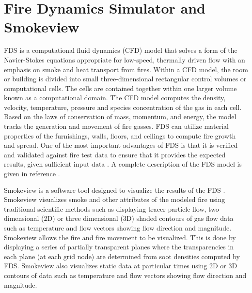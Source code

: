 \documentclass[11pt,oneside]{book}
\begin{document}
\chapter{Fire Dynamics Simulator and Smokeview}
FDS is a computational fluid dynamics (CFD) model that solves a form of the Navier-Stokes equations appropriate for low-speed, thermally driven flow with an emphasis on smoke and heat transport from fires.  Within a CFD model, the room or building is divided into small three-dimensional rectangular control volumes or computational cells.  The cells are contained together within one larger volume known as a computational domain.  The CFD model computes the density, velocity, temperature, pressure and species concentration of the gas in each cell.  Based on the laws of conservation of mass, momentum,  and energy, the model tracks the generation and movement of fire gasses.  FDS can utilize material properties of the furnishings, walls, floors, and ceilings to compute fire growth and spread.  One of the most important advantages of FDS is that it is verified and validated against fire test data to ensure that it provides the expected results, given sufficient input data \cite{FDS_Verification_Guide,FDS_Validation_Guide}.  A complete description of the FDS model is given in reference \cite{FDS_Tech_Guide}.

Smokeview is a software tool designed to visualize the results of the FDS \cite{Smokeview_Users_Guide}.  Smokeview visualizes smoke and other attributes of the modeled fire using traditional scientific methods such as displaying tracer particle flow, two dimensional (2D) or three dimensional (3D) shaded contours of gas flow data such as temperature and flow vectors showing flow direction and magnitude.  Smokeview allows the fire and fire movement to be visualized.  This is done by displaying a series of partially transparent planes where the transparencies in each plane (at each grid node) are determined from soot densities computed by FDS.  Smokeview also visualizes static data at particular times using 2D or 3D contours of data such as temperature and flow vectors showing flow direction and magnitude.
\end{document}

